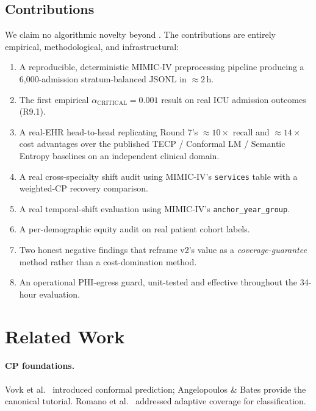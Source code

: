 \documentclass[11pt,letterpaper]{article}
\begin{document}
\subsection{Contributions}
We claim no algorithmic novelty beyond \cite{AnonUASEFR7}. The contributions
are entirely empirical, methodological, and infrastructural:
\begin{enumerate}[leftmargin=*,itemsep=2pt]
\item A reproducible, deterministic MIMIC-IV preprocessing pipeline
producing a 6,000-admission stratum-balanced JSONL in $\approx 2$\,h.
\item The first empirical $\alpha_{\text{CRITICAL}} = 0.001$ result on
real ICU admission outcomes (R9.1).
\item A real-EHR head-to-head replicating Round 7's $\approx 10\times$ recall
and $\approx 14\times$ cost advantages over the published TECP / Conformal
LM / Semantic Entropy baselines on an independent clinical domain.
\item A real cross-specialty shift audit using MIMIC-IV's \texttt{services}
table with a weighted-CP recovery comparison.
\item A real temporal-shift evaluation using MIMIC-IV's
\texttt{anchor\_year\_group}.
\item A per-demographic equity audit on real patient cohort labels.
\item Two honest negative findings that reframe v2's value as a
\emph{coverage-guarantee} method rather than a cost-domination method.
\item An operational PHI-egress guard, unit-tested and effective throughout
the 34-hour evaluation.
\end{enumerate}

\section{Related Work}

\paragraph{CP foundations.} Vovk et al.\ \cite{VovkBookshelf2005} introduced
conformal prediction; Angelopoulos \& Bates \cite{AngelopoulosBates2021}
provide the canonical tutorial. Romano et al.\ \cite{Romano2020} addressed
adaptive coverage for classification.
\end{document}

